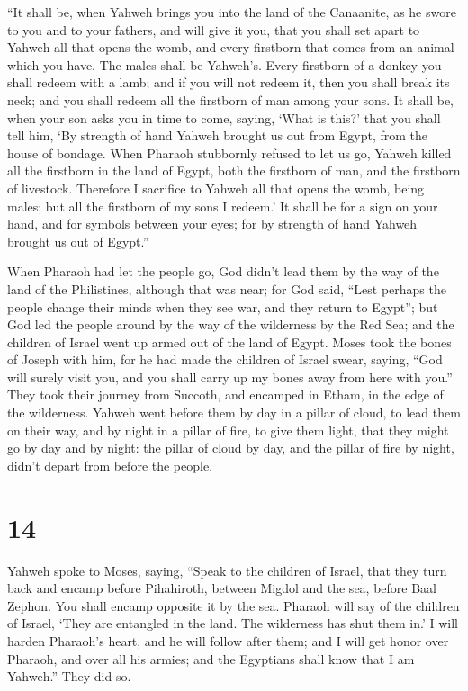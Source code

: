  ``It shall be, when Yahweh brings you into the land of
the Canaanite, as he swore to you and to your fathers, and will give it
you,  that you shall set apart to Yahweh all that opens
the womb, and every firstborn that comes from an animal which you have.
The males shall be Yahweh's.  Every firstborn of a donkey
you shall redeem with a lamb; and if you will not redeem it, then you
shall break its neck; and you shall redeem all the firstborn of man
among your sons.  It shall be, when your son asks you in
time to come, saying, `What is this?' that you shall tell him, `By
strength of hand Yahweh brought us out from Egypt, from the house of
bondage.  When Pharaoh stubbornly refused to let us go,
Yahweh killed all the firstborn in the land of Egypt, both the firstborn
of man, and the firstborn of livestock. Therefore I sacrifice to Yahweh
all that opens the womb, being males; but all the firstborn of my sons I
redeem.'  It shall be for a sign on your hand, and for
symbols between your eyes; for by strength of hand Yahweh brought us out
of Egypt.''

 When Pharaoh had let the people go, God didn't lead them
by the way of the land of the Philistines, although that was near; for
God said, ``Lest perhaps the people change their minds when they see
war, and they return to Egypt'';  but God led the people
around by the way of the wilderness by the Red Sea; and the children of
Israel went up armed out of the land of Egypt.  Moses
took the bones of Joseph with him, for he had made the children of
Israel swear, saying, ``God will surely visit you, and you shall carry
up my bones away from here with you.''  They took their
journey from Succoth, and encamped in Etham, in the edge of the
wilderness.  Yahweh went before them by day in a pillar
of cloud, to lead them on their way, and by night in a pillar of fire,
to give them light, that they might go by day and by night:
 the pillar of cloud by day, and the pillar of fire by
night, didn't depart from before the people.

\hypertarget{section-13}{%
\section{14}\label{section-13}}

 Yahweh spoke to Moses, saying,  ``Speak to
the children of Israel, that they turn back and encamp before
Pihahiroth, between Migdol and the sea, before Baal Zephon. You shall
encamp opposite it by the sea.  Pharaoh will say of the
children of Israel, `They are entangled in the land. The wilderness has
shut them in.'  I will harden Pharaoh's heart, and he will
follow after them; and I will get honor over Pharaoh, and over all his
armies; and the Egyptians shall know that I am Yahweh.'' They did so.

